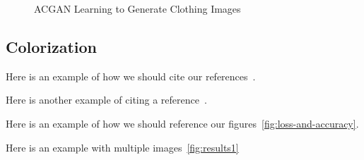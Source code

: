 \documentclass[conference]{IEEEtran}
\begin{document}
    \begin{figure}
        \caption{ACGAN Learning to Generate Clothing Images}
        \label{fig:results1}
        \centering
    \end{figure}

    \subsection{Colorization}\label{subsec:results-colorization}

    Here is an example of how we should cite our references~\cite{e-in-style}.

    Here is another example of citing a reference~\cite{pytorch-generative-model-collections}.

    Here is an example of how we should reference our figures~\autoref{fig:loss-and-accuracy}.

    Here is an example with multiple images~\autoref{fig:results1}
\end{document}
